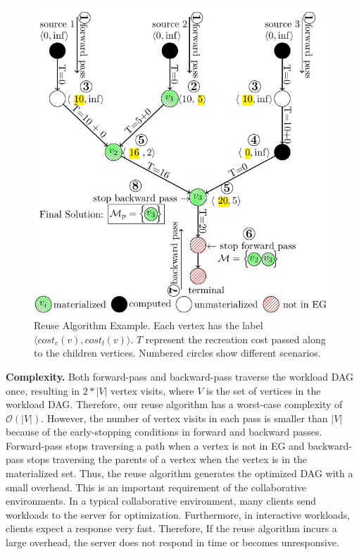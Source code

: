 \begin{figure}
\centering
\includegraphics[width=\linewidth]{../images/tikz-standalone/reuse-algorithm}
\caption{Reuse Algorithm Example. Each vertex has the label $\langle cost_c(v),cost_l(v) \rangle$. $T$ represent the recreation cost passed along to the children vertices. Numbered circles show different scenarios.}
\label{fig-reuse-algorithm}
\end{figure}

\textbf{Complexity.} 
Both forward-pass and backward-pass traverse the workload DAG once, resulting in $2*|V|$ vertex visits, where $V$ is the set of vertices in the workload DAG.
Therefore, our reuse algorithm has a worst-case complexity of $\mathcal{O}(|V|)$.
However, the number of vertex visits in each pass is smaller than $|V|$ because of the early-stopping conditions in forward and backward passes.
Forward-pass stops traversing a path when a vertex is not in EG and backward-pass stops traversing the parents of a vertex when the vertex is in the materialized set.
Thus, the reuse algorithm generates the optimized DAG with a small overhead.
This is an important requirement of the collaborative environments.
In a typical collaborative environment, many clients send workloads to the server for optimization.
Furthermore, in interactive workloads, clients expect a response very fast.
Therefore, If the reuse algorithm incurs a large overhead, the server does not respond in time or becomes unresponsive.

